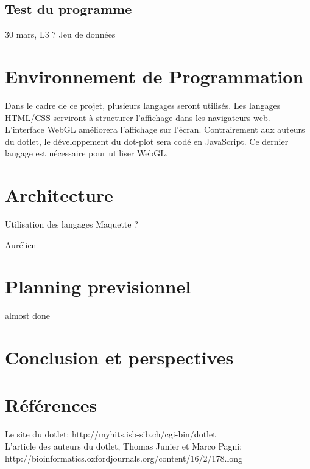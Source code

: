 \documentclass{report}
\begin{document}
\section{Test du programme}

30 mars, L3 ?
Jeu de données

\chapter{Environnement de Programmation}

Dans le cadre de ce projet, plusieurs langages seront utilisés. Les langages HTML/CSS serviront à structurer l'affichage dans les navigateurs web. L'interface WebGL améliorera l'affichage sur l'écran. Contrairement aux auteurs du dotlet, le développement du dot-plot sera codé en JavaScript.  Ce dernier langage est nécessaire pour utiliser WebGL.


\chapter{Architecture}
Utilisation des langages
Maquette ?

Aurélien


\chapter{Planning previsionnel}
almost done



\chapter*{Conclusion et perspectives}


\chapter*{Références}
Le site du dotlet: http://myhits.isb-sib.ch/cgi-bin/dotlet\\
L'article des auteurs du dotlet, Thomas Junier et Marco Pagni: http://bioinformatics.oxfordjournals.org/content/16/2/178.long\\
\end{document}
